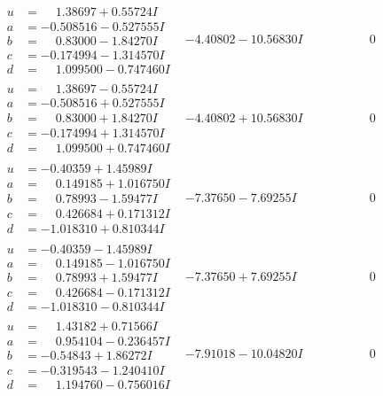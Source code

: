 \documentclass[1p]{elsarticle_modified}
\theoremstyle{definition}
\begin{document}
$$\begin{array}{c|c|c}
\begin{aligned}
u &= \phantom{-}1.38697 + 0.55724 I \\
a &= -0.508516 - 0.527555 I \\
b &= \phantom{-}0.83000 - 1.84270 I \\
c &= -0.174994 - 1.314570 I \\
d &= \phantom{-}1.099500 - 0.747460 I\end{aligned}
 & -4.40802 - 10.56830 I & \phantom{-0.000000 } 0 \\ \hline\begin{aligned}
u &= \phantom{-}1.38697 - 0.55724 I \\
a &= -0.508516 + 0.527555 I \\
b &= \phantom{-}0.83000 + 1.84270 I \\
c &= -0.174994 + 1.314570 I \\
d &= \phantom{-}1.099500 + 0.747460 I\end{aligned}
 & -4.40802 + 10.56830 I & \phantom{-0.000000 } 0 \\ \hline\begin{aligned}
u &= -0.40359 + 1.45989 I \\
a &= \phantom{-}0.149185 + 1.016750 I \\
b &= \phantom{-}0.78993 - 1.59477 I \\
c &= \phantom{-}0.426684 + 0.171312 I \\
d &= -1.018310 + 0.810344 I\end{aligned}
 & -7.37650 - 7.69255 I & \phantom{-0.000000 } 0 \\ \hline\begin{aligned}
u &= -0.40359 - 1.45989 I \\
a &= \phantom{-}0.149185 - 1.016750 I \\
b &= \phantom{-}0.78993 + 1.59477 I \\
c &= \phantom{-}0.426684 - 0.171312 I \\
d &= -1.018310 - 0.810344 I\end{aligned}
 & -7.37650 + 7.69255 I & \phantom{-0.000000 } 0 \\ \hline\begin{aligned}
u &= \phantom{-}1.43182 + 0.71566 I \\
a &= \phantom{-}0.954104 - 0.236457 I \\
b &= -0.54843 + 1.86272 I \\
c &= -0.319543 - 1.240410 I \\
d &= \phantom{-}1.194760 - 0.756016 I\end{aligned}
 & -7.91018 - 10.04820 I & \phantom{-0.000000 } 0\\

\end{array}$$
\end{document}
